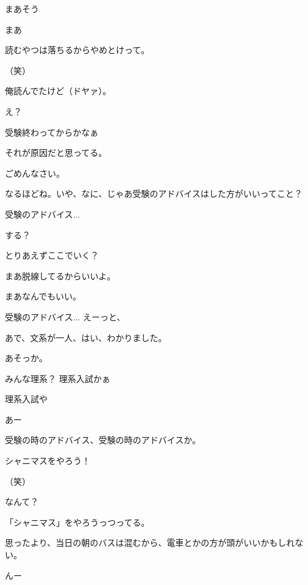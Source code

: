 \begin{multicols}{3}
{        まあそう

        まあ

        読むやつは落ちるからやめとけって。

        （笑）

        俺読んでたけど（ドヤァ）。

        え？

        受験終わってからかなぁ

        それが原因だと思ってる。

        ごめんなさい。

        なるほどね。いや、なに、じゃあ受験のアドバイスはした方がいいってこと？

        受験のアドバイス...

        する？

        とりあえずここでいく？

        まあ脱線してるからいいよ。

        まあなんでもいい。

        受験のアドバイス... えーっと、

        あで、文系が一人、はい、わかりました。

        あそっか。

        みんな理系？ 理系入試かぁ

        理系入試や

        あー

        受験の時のアドバイス、受験の時のアドバイスか。

        シャニマスをやろう！

        （笑）

        なんて？

        「シャニマス」をやろうっつってる。

    


    

        思ったより、当日の朝のバスは混むから、電車とかの方が頭がいいかもしれない。

        んー

}
\end{multicols}
